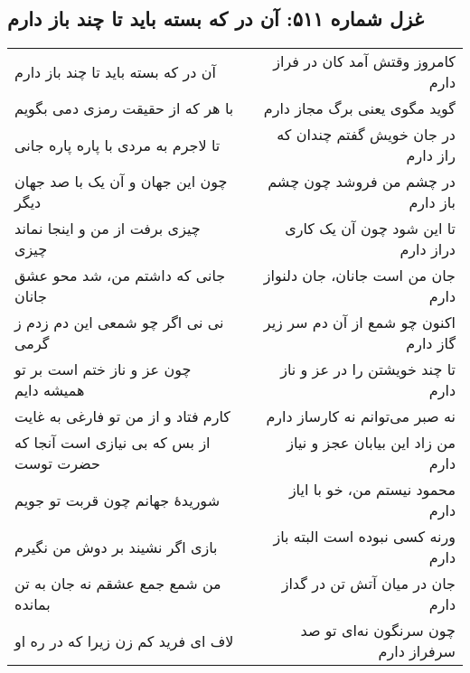 \begin{center}
\section*{غزل شماره ۵۱۱: آن در که بسته باید تا چند باز دارم}
\label{sec:511}
\begin{longtable}{l p{0.5cm} r}
آن در که بسته باید تا چند باز دارم
&&
کامروز وقتش آمد کان در فراز دارم
\\
با هر که از حقیقت رمزی دمی بگویم
&&
گوید مگوی یعنی برگ مجاز دارم
\\
تا لاجرم به مردی با پاره پاره جانی
&&
در جان خویش گفتم چندان که راز دارم
\\
چون این جهان و آن یک با صد جهان دیگر
&&
در چشم من فروشد چون چشم باز دارم
\\
چیزی برفت از من و اینجا نماند چیزی
&&
تا این شود چون آن یک کاری دراز دارم
\\
جانی که داشتم من، شد محو عشق جانان
&&
جان من است جانان، جان دلنواز دارم
\\
نی نی اگر چو شمعی این دم زدم ز گرمی
&&
اکنون چو شمع از آن دم سر زیر گاز دارم
\\
چون عز و ناز ختم است بر تو همیشه دایم
&&
تا چند خویشتن را در عز و ناز دارم
\\
کارم فتاد و از من تو فارغی به غایت
&&
نه صبر می‌توانم نه کارساز دارم
\\
از بس که بی نیازی است آنجا که حضرت توست
&&
من زاد این بیابان عجز و نیاز دارم
\\
شوریدهٔ جهانم چون قربت تو جویم
&&
محمود نیستم من، خو با ایاز دارم
\\
بازی اگر نشیند بر دوش من نگیرم
&&
ورنه کسی نبوده است البته باز دارم
\\
من شمع جمع عشقم نه جان به تن بمانده
&&
جان در میان آتش تن در گداز دارم
\\
لاف ای فرید کم زن زیرا که در ره او
&&
چون سرنگون نه‌ای تو صد سرفراز دارم
\\
\end{longtable}
\end{center}
